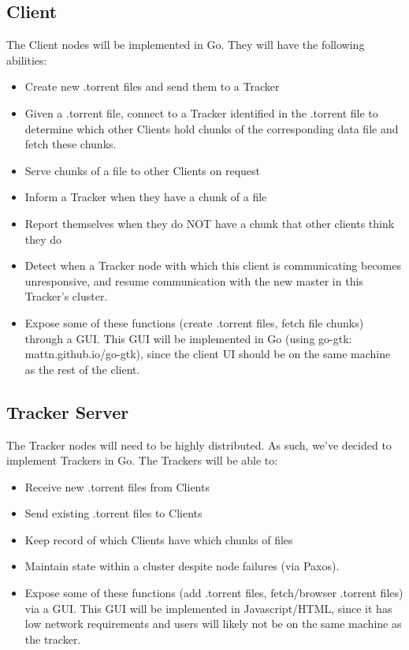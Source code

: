 \documentclass[12pt]{article}
\begin{document}
\subsection*{Client}
The Client nodes will be implemented in Go.
They will have the following abilities:
\begin{itemize}
\item  Create new .torrent files and send them to a Tracker
\item  Given a .torrent file, connect to a Tracker identified in the
       .torrent file to determine which other Clients hold chunks of the
       corresponding data file and fetch these chunks.
\item  Serve chunks of a file to other Clients on request
\item  Inform a Tracker when they have a chunk of a file
\item  Report themselves when they do NOT have a chunk that other clients
       think they do
\item  Detect when a Tracker node with which this client is communicating
       becomes unresponsive, and resume communication with the new master in
       this Tracker's cluster.
\item  Expose some of these functions (create .torrent files, fetch file chunks)
       through a GUI. This GUI will be implemented in Go (using go-gtk:
       mattn.github.io/go-gtk), since the client UI should be on the same
       machine as the rest of the client.
\end{itemize}

\subsection*{Tracker Server}
The Tracker nodes will need to be highly distributed.
As such, we've decided to implement Trackers in Go.
The Trackers will be able to:
\begin{itemize}
\item  Receive new .torrent files from Clients
\item  Send existing .torrent files to Clients
\item  Keep record of which Clients have which chunks of files
\item  Maintain state within a cluster despite node failures (via Paxos).
\item  Expose some of these functions (add .torrent files, fetch/browser
       .torrent files) via a GUI. This GUI will be implemented in
       Javascript/HTML, since it has low network requirements and users
       will likely not be on the same machine as the tracker.
\end{itemize}
\end{document}
